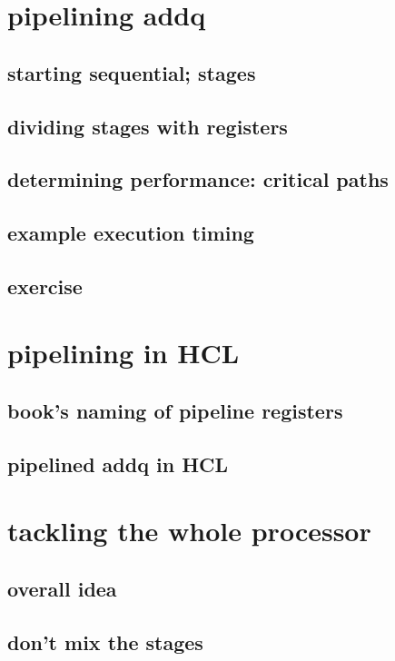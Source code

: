 

\section{pipelining addq}

\subsection{starting sequential; stages}



\subsection{dividing stages with registers}



\subsection{determining performance: critical paths}



\subsection{example execution timing}




\subsection{exercise}


\section{pipelining in HCL}

\subsection{book's naming of pipeline registers}



\subsection{pipelined addq in HCL}




\section{tackling the whole processor}

\subsection{overall idea}



\subsection{don't mix the stages}






